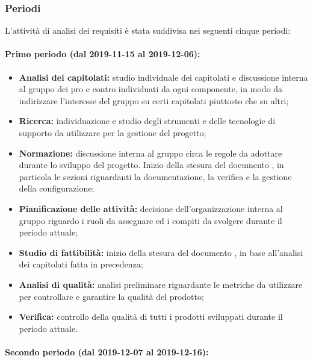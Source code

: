 		\subsubsection{Periodi}
		
			L'attività di analisi dei requisiti è stata suddivisa nei seguenti cinque periodi:
			
			\paragraph{Primo periodo (dal 2019-11-15 al 2019-12-06):}
			
				\begin{itemize}
					\item \textbf{Analisi dei capitolati:} studio individuale dei capitolati e discussione interna al gruppo dei pro e contro individuati da ogni componente, in modo da indirizzare l'interesse del gruppo su certi capitolati piuttosto che su altri;
					\item \textbf{Ricerca:} individuazione e studio degli strumenti e delle tecnologie di supporto da utilizzare per la gestione del progetto;
					\item \textbf{Normazione:} discussione interna al gruppo circa le regole da adottare durante lo sviluppo del progetto. Inizio della stesura del documento , in particola le sezioni riguardanti la documentazione, la verifica e la gestione della configurazione;
					\item \textbf{Pianificazione delle attività:} decisione dell'organizzazione interna al gruppo riguardo i ruoli da assegnare ed i compiti da svolgere durante il periodo attuale;
					\item \textbf{Studio di fattibilità:} inizio della stesura del documento , in base all'analisi dei capitolati fatta in precedenza;
					\item \textbf{Analisi di qualità:} analisi preliminare riguardante le metriche da utilizzare per controllare e garantire la qualità del prodotto;
					\item \textbf{Verifica:} controllo della qualità di tutti i prodotti sviluppati durante il periodo attuale.
				\end{itemize}
			
			\paragraph{Secondo periodo (dal 2019-12-07 al 2019-12-16):}
			
